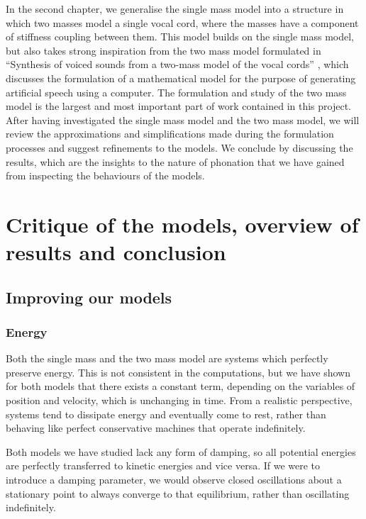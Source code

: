 \documentclass{report}
\begin{document}
In the second chapter, we generalise the single mass model into a structure in which two masses model a single vocal cord,
where the masses have a component of stiffness coupling between them.
This model builds on the single mass model,
but also takes strong inspiration from the two mass model formulated in ``Synthesis of voiced sounds from a two-mass model of the vocal cords'' \cite{ishizaka_flanagan_1972},
which discusses the formulation of a mathematical model for the purpose of generating artificial speech using a computer.
The formulation and study of the two mass model is the largest and most important part of work contained in this project.
After having investigated the single mass model and the two mass model,
we will review the approximations and simplifications made during the formulation processes and suggest refinements to the models.
We conclude by discussing the results, which are the insights to the nature of phonation that we have gained from inspecting the behaviours of the models.





\chapter{Critique of the models, overview of results and conclusion}
\label{cha:conclusion}

\section{Improving our models}

\subsection{Energy}

Both the single mass and the two mass model are systems which perfectly preserve energy.
This is not consistent in the computations,
but we have shown for both models that there exists a constant term,
depending on the variables of position and velocity,
which is unchanging in time.
From a realistic perspective,
systems tend to dissipate energy and eventually come to rest,
rather than behaving like perfect conservative machines that operate indefinitely.

Both models we have studied lack any form of damping,
so all potential energies are perfectly transferred to kinetic energies and vice versa.
If we were to introduce a damping parameter,
we would observe closed oscillations about a stationary point to always converge to that equilibrium,
rather than oscillating indefinitely.
\end{document}
